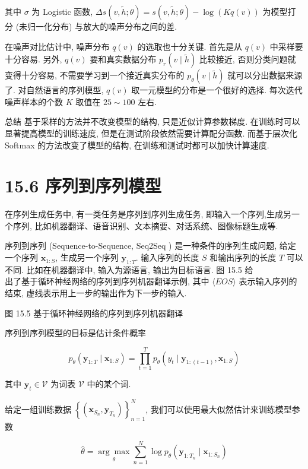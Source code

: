 \documentclass[10pt]{article}
\begin{document}
其中 $\sigma$ 为 Logistic 函数, $\Delta s(v, \tilde{h} ; \theta)=s(v, \tilde{h} ; \theta)-\log (K q(v))$ 为模型打分 (未归一化分布) 与放大的噪声分布之间的差.

在噪声对比估计中, 噪声分布 $q(v)$ 的选取也十分关键. 首先是从 $q(v)$ 中采样要十分容易. 另外, $q(v)$ 要和真实数据分布 $p_{r}(v \mid \tilde{h})$ 比较接近, 否则分类问题就变得十分容易, 不需要学习到一个接近真实分布的 $p_{\theta}(v \mid \tilde{h})$ 就可以分出数据来源了. 对自然语言的序列模型, $q(v)$ 取一元模型的分布是一个很好的选择. 每次迭代噪声样本的个数 $K$ 取值在 $25 \sim 100$ 左右.

总结 基于采样的方法并不改变模型的结构, 只是近似计算参数梯度. 在训练时可以显著提高模型的训练速度, 但是在测试阶段依然需要计算配分函数. 而基于层次化 Softmax 的方法改变了模型的结构, 在训练和测试时都可以加快计算速度.

\section*{15.6 序列到序列模型}
在序列生成任务中, 有一类任务是序列到序列生成任务, 即输入一个序列,生成另一个序列, 比如机器翻译、语音识别、文本摘要、对话系统、图像标题生成等.

序列到序列 (Sequence-to-Sequence, Seq2Seq ) 是一种条件的序列生成问题, 给定一个序列 $\boldsymbol{x}_{1: S}$, 生成另一个序列 $\boldsymbol{y}_{1: T}$. 输入序列的长度 $S$ 和输出序列的长度 $T$ 可以不同. 比如在机器翻译中, 输入为源语言, 输出为目标语言. 图 15.5 给\\
出了基于循环神经网络的序列到序列机器翻译示例, 其中 $\langle E O S\rangle$ 表示输入序列的结束, 虚线表示用上一步的输出作为下一步的输入.



图 15.5 基于循环神经网络的序列到序列机器翻译

序列到序列模型的目标是估计条件概率


\begin{equation*}
p_{\theta}\left(\boldsymbol{y}_{1: T} \mid \boldsymbol{x}_{1: S}\right)=\prod_{t=1}^{T} p_{\theta}\left(y_{t} \mid \boldsymbol{y}_{1:(t-1)}, \boldsymbol{x}_{1: S}\right) \tag{15.96}
\end{equation*}


其中 $\boldsymbol{y}_{t} \in \mathcal{V}$ 为词表 $\mathcal{V}$ 中的某个词.

给定一组训练数据 $\left\{\left(\boldsymbol{x}_{S_{n}}, \boldsymbol{y}_{T_{n}}\right)\right\}_{n=1}^{N}$, 我们可以使用最大似然估计来训练模型参数


\begin{equation*}
\hat{\theta}=\underset{\theta}{\arg \max } \sum_{n=1}^{N} \log p_{\theta}\left(\boldsymbol{y}_{1: T_{n}} \mid \boldsymbol{x}_{1: S_{n}}\right) \tag{15.97}
\end{equation*}
\end{document}
